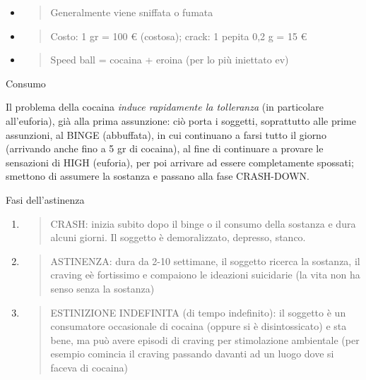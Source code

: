 \documentclass[]{article}
\newcommand{\euro}{€}
\begin{document}
\begin{itemize}
\item
  \begin{quote}
  Generalmente viene sniffata o fumata
  \end{quote}
\item
  \begin{quote}
  Costo: 1 gr = 100 \euro{} (costosa); crack: 1 pepita 0,2 g = 15
  \euro{}
  \end{quote}
\item
  \begin{quote}
  Speed ball = cocaina + eroina (per lo più iniettato ev)
  \end{quote}
\end{itemize}

Consumo

Il problema della cocaina \emph{induce rapidamente la tolleranza} (in
particolare all'euforia), già alla prima assunzione: ciò porta i
soggetti, soprattutto alle prime assunzioni, al BINGE (abbuffata), in
cui continuano a farsi tutto il giorno (arrivando anche fino a 5 gr di
cocaina), al fine di continuare a provare le sensazioni di HIGH
(euforia), per poi arrivare ad essere completamente spossati; smettono
di assumere la sostanza e passano alla fase CRASH-DOWN.

Fasi dell'astinenza

\begin{enumerate}
\def\labelenumi{\arabic{enumi})}
\item
  \begin{quote}
  CRASH: inizia subito dopo il binge o il consumo della sostanza e dura
  alcuni giorni. Il soggetto è demoralizzato, depresso, stanco.
  \end{quote}
\item
  \begin{quote}
  ASTINENZA: dura da 2-10 settimane, il soggetto ricerca la sostanza, il
  craving eè fortissimo e compaiono le ideazioni suicidarie (la vita non
  ha senso senza la sostanza)
  \end{quote}
\item
  \begin{quote}
  ESTINIZIONE INDEFINITA (di tempo indefinito): il soggetto è un
  consumatore occasionale di cocaina (oppure si è disintossicato) e sta
  bene, ma può avere episodi di craving per stimolazione ambientale (per
  esempio comincia il craving passando davanti ad un luogo dove si
  faceva di cocaina)
  \end{quote}
\end{enumerate}
\end{document}
